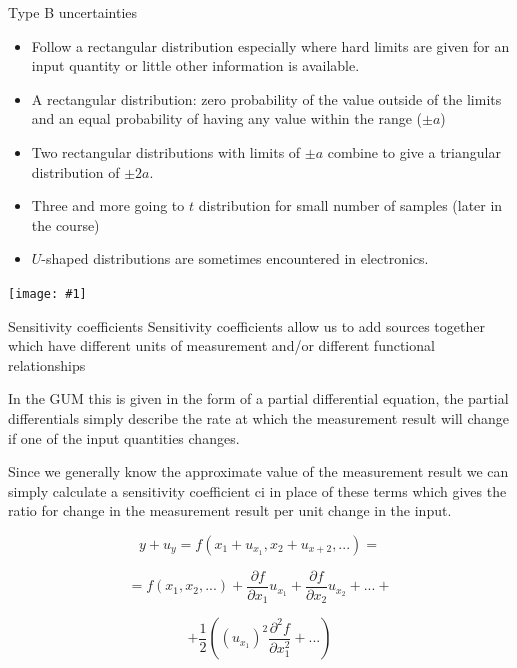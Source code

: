 \documentclass[12pt]{beamer}
\newcommand{\fig}[1]{\centering\texttt{[image: \#1]}}
\begin{document}
\begin{frame}{Type B uncertainties}
\begin{itemize}
\item Follow a rectangular distribution especially where hard limits are given for an input quantity or little other information is available.
\item A rectangular distribution: zero probability of the value outside of the limits and an equal probability of having any value within the range ($ \pm a$)
\item Two rectangular distributions with limits of $\pm a$ combine to give a triangular distribution of $\pm 2a$.
\item Three and more going to $t$ distribution for small number of samples (later in the course)
\item  $U$-shaped distributions are sometimes encountered in electronics. 
\end{itemize}
\end{frame}

\begin{frame}
\fig{Distributions-and-Divisors}
\end{frame}

\begin{frame}{Sensitivity coefficients}
Sensitivity coefficients allow us to add sources together which have different units of measurement and/or different functional relationships



In the GUM this is given in the form of a partial differential equation, the partial differentials simply describe the rate at which the measurement result will change if one of the input quantities changes. 



Since we generally know the approximate value of the measurement result we can simply calculate a sensitivity coefficient ci in place of these terms which gives the ratio for change in the measurement result per unit change in the input.

\[
y + u_y = f(x_1 + u_{x_1}, x_2 + u_{x+2}, ... )  = 
\]

\[
= f(x_1, x_2 , ...) + \frac{\partial f}{\partial x_1} u_{x_1} +  \frac{\partial f}{\partial x_2} u_{x_2} + ...  + 
\]


\[
+ \frac{1}{2} \left( (u_{x_1} )^2 \frac{\partial^2 f}{\partial x_1^2} +  ...   \right)
\]

\end{frame}
\end{document}
